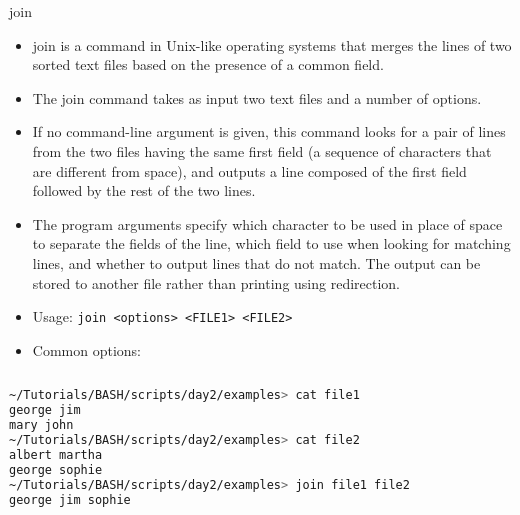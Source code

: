 \documentclass[slidestop,mathserif,compress,xcolor=svgnames]{beamer}
\begin{document}
\begin{frame}{\small join}
  \begin{itemize}
    \item join is a command in Unix-like operating systems that merges the lines of two sorted text files based on the presence of a common field.
    \item The join command takes as input two text files and a number of options. 
    \item If no command-line argument is given, this command looks for a pair of lines from the two files having the same first field (a sequence of characters that are different from space), and outputs a line composed of the first field followed by the rest of the two lines.
    \item The program arguments specify which character to be used in place of space to separate the fields of the line, which field to use when looking for matching lines, and whether to output lines that do not match. The output can be stored to another file rather than printing using redirection.
    \item Usage: \texttt{join <options> <FILE1> <FILE2>}
    \framebreak
    \item Common options:
  \end{itemize}
  \begin{columns}
    \begin{lstlisting}[language=bash]
~/Tutorials/BASH/scripts/day2/examples> cat file1
george jim
mary john
~/Tutorials/BASH/scripts/day2/examples> cat file2
albert martha
george sophie
~/Tutorials/BASH/scripts/day2/examples> join file1 file2
george jim sophie
    \end{lstlisting}
  \end{columns}
\end{frame}
\end{document}
